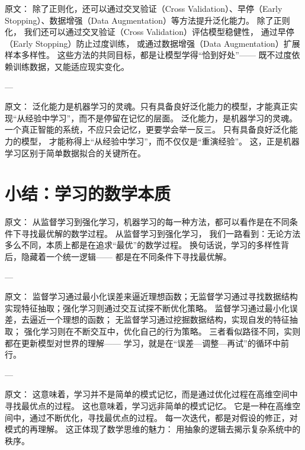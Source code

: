 原文：
除了正则化，还可以通过交叉验证（Cross Validation）、早停（Early Stopping）、数据增强（Data Augmentation）等方法提升泛化能力。
除了正则化，  
我们还可以通过交叉验证（Cross Validation）评估模型稳健性，  
通过早停（Early Stopping）防止过度训练，  
或通过数据增强（Data Augmentation）扩展样本多样性。  
这些方法的共同目标，都是让模型学得“恰到好处”——  
既不过度依赖训练数据，又能适应现实变化。

---

原文：
泛化能力是机器学习的灵魂。只有具备良好泛化能力的模型，才能真正实现“从经验中学习”，而不是停留在记忆的层面。
泛化能力，是机器学习的灵魂。  
一个真正智能的系统，不应只会记忆，更要学会举一反三。  
只有具备良好泛化能力的模型，  
才能称得上“从经验中学习”，而不仅仅是“重演经验”。  
这，正是机器学习区别于简单数据拟合的关键所在。


\section{小结：学习的数学本质}

原文：
从监督学习到强化学习，机器学习的每一种方法，都可以看作是在不同条件下寻找最优解的数学过程。
从监督学习到强化学习，  
我们一路看到：无论方法多么不同，本质上都是在追求“最优”的数学过程。  
换句话说，学习的多样性背后，隐藏着一个统一逻辑——  
都是在不同条件下寻找最优解。

---

原文：
监督学习通过最小化误差来逼近理想函数；无监督学习通过寻找数据结构实现特征抽取；强化学习则通过交互试探不断优化策略。
监督学习通过最小化误差，去逼近一个理想的函数；  
无监督学习通过挖掘数据结构，实现自发的特征抽取；  
强化学习则在不断交互中，优化自己的行为策略。  
三者看似路径不同，实则都在更新模型对世界的理解——  
学习，就是在“误差—调整—再试”的循环中前行。

---

原文：
这意味着，学习并不是简单的模式记忆，而是通过优化过程在高维空间中寻找最优点的过程。
这也意味着，学习远非简单的模式记忆。  
它是一种在高维空间中，通过不断优化，寻找最优点的过程。  
每一次迭代，都是对假设的修正，对模式的再理解。  
这正体现了数学思维的魅力：  
用抽象的逻辑去揭示复杂系统中的秩序。

